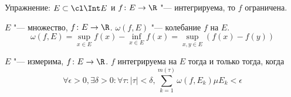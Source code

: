 
Упражнение: $E \subset \cl \Int E$ и $f\colon E \to \R$ "--- интегрируема, то $f$ ограничена.

\begin{Def}
	$E$ "--- множество, $f\colon E \to \R$.
	$\omega(f, E)$ "--- колебание $f$ на $E$.
	\[ \omega(f, E) = \sup_{x \in E} f(x) - \inf_{x \in E} f(x) = \sup_{x, y \in E} (f(x) - f(y)) \]
\end{Def}

\begin{theorem}\label{integral_criteria_oscill}
	$E$ "--- измерима, $f\colon E \to \R$.
	$f$ интегрируема на $E$ тогда и только тогда, когда
	\[ \forall \epsilon > 0, \exists \delta > 0\colon \forall \tau\colon |\tau| < \delta, \sum_{k=1}^{m(\tau)} \omega(f, E_k) \mu E_k < \epsilon\]
\end{theorem}
